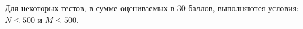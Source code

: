 Для некоторых тестов, в сумме оцениваемых в $30$ баллов, выполняются условия: $N \le 500$ и $M \le 500$. 
